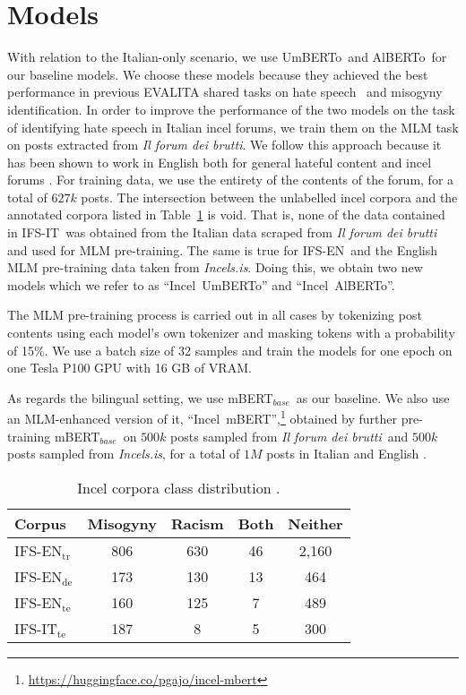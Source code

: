\documentclass[
twocolumn,
]{ceurart}
\newcommand{\dsENclassification}{IFS-EN}
\newcommand{\dsITclassification}{IFS-IT}
\newcommand{\mbert}{\mbox{mBERT$_{base}$}}
\newcommand{\imbert}{\mbox{Incel mBERT}}
\newcommand{\umbert}{\mbox{UmBERTo}}
\newcommand{\albert}{\mbox{AlBERTo}}
\newcommand{\iumbert}{\mbox{Incel UmBERTo}}
\newcommand{\ialbert}{\mbox{Incel AlBERTo}}
\newcommand{\dsENclassificationtrain}{IFS-EN$_{\mbox{tr}}$} %
\newcommand{\dsENclassificationdev}{IFS-EN$_{\mbox{de}}$} %
\newcommand{\dsENclassificationtest}{IFS-EN$_{\mbox{te}}$} %
\newcommand{\enforum}{\textit{Incels.is}}
\newcommand{\itforum}{\textit{Il forum dei brutti}}
\begin{document}
\section{Models}
\label{sec:models}
With relation to the Italian-only scenario, we use \umbert\, and \albert\, for our baseline models. We choose these models because they achieved the best performance in previous EVALITA shared tasks on hate speech~\cite{basileEVALITA2020Overview} and misogyny~\cite{fersiniAMIEVALITA2020Automatic2020} identification.
In order to improve the performance of the two models on the task of identifying hate speech in Italian incel forums, we train them on the MLM task on posts extracted from \itforum. We follow this approach because it has been shown to work in English both for general hateful content \cite{caselli-etal-2021-hatebert} and incel forums \cite{gajo2023identification}.
For training data, we use the entirety of the contents of the forum, for a total of $627k$ posts. The intersection between the unlabelled
incel corpora and the annotated corpora listed in Table~\ref{tab:incel-corpora-distributions} is void. That is, none of the data contained in \dsITclassification\, was obtained from the Italian data scraped from \itforum\, and used for MLM pre-training. The same is true for \dsENclassification\, and the English MLM pre-training data taken from \enforum.
Doing this, we obtain two new models which we refer to as ``\iumbert'' and ``\ialbert''.

The MLM pre-training process is carried out in all cases by tokenizing post contents using each model's own tokenizer and masking tokens with a probability of 15\%. We use a batch size of 32 samples and train the models for one epoch on one Tesla P100 GPU with 16 GB of VRAM.

As regards the bilingual setting, we use \mbert\, as our baseline. We also use an MLM-enhanced version of it, ``\imbert'',\footnote{\url{https://huggingface.co/pgajo/incel-mbert}}
obtained by further pre-training \mbert\, on $500k$ posts sampled from \itforum\, and $500k$ posts sampled from \enforum, for a total of $1M$ posts in Italian and English \cite{gajo2023identification}.

\begin{table}[t]
  \caption{Incel corpora class distribution \cite{gajo2023identification}.}
  \label{tab:incel-corpora-distributions}
  \centering
  \begin{tabular}{l|cccc}
    \hline
    \bf Corpus                & \bf Misogyny & \bf Racism & \bf Both & \bf  Neither \\
    \hline
    \dsENclassificationtrain\,	       &  806 & 630 & 46 & 2,160 \\
    \dsENclassificationdev 	           &  173 & 130 & 13 & 464 \\
    \dsENclassificationtest 	       &  160 & 125 & 7  & 489 \\
    \dsITclassification$_{\mbox{te}}$  &  187 &   8 & 5  & 300 \\
    \hline
    \end{tabular}
\end{table}
\end{document}
